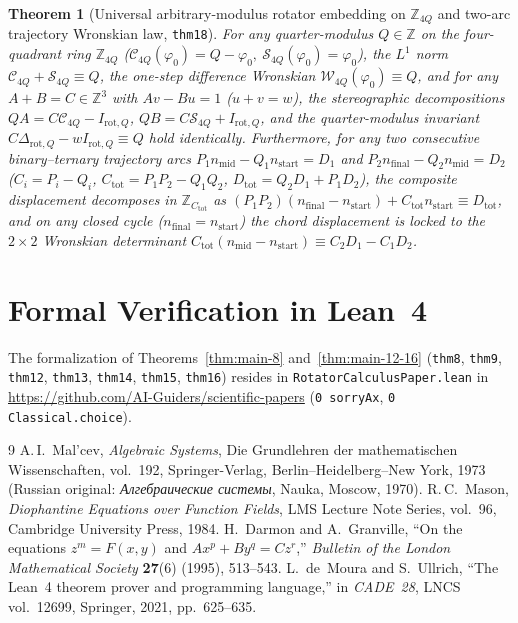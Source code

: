\documentclass[11pt,a4paper]{article}
\theoremstyle{plain}
\newtheorem{theorem}{Theorem}[section]
\theoremstyle{definition}
\begin{document}
\begin{theorem}[Universal arbitrary-modulus rotator embedding on $\mathbb{Z}_{4Q}$ and two-arc trajectory Wronskian law, \texttt{thm18}]
\label{thm:arbitrary-modulus-thm18}
For any quarter-modulus $Q\in\mathbb{Z}$ on the four-quadrant ring $\mathbb{Z}_{4Q}$ ($\mathcal{C}_{4Q}(\varphi_0)=Q-\varphi_0,\ \mathcal{S}_{4Q}(\varphi_0)=\varphi_0$), the $L^1$ norm $\mathcal{C}_{4Q}+\mathcal{S}_{4Q}\equiv Q$, the one-step difference Wronskian $\mathcal{W}_{4Q}(\varphi_0)\equiv Q$, and for any $A+B=C\in\mathbb{Z}^3$ with $Av-Bu=1$ ($u+v=w$), the stereographic decompositions $Q A = C\mathcal{C}_{4Q} - I_{\mathrm{rot},Q}$, $Q B = C\mathcal{S}_{4Q} + I_{\mathrm{rot},Q}$, and the quarter-modulus invariant $C\Delta_{\mathrm{rot},Q} - w I_{\mathrm{rot},Q} \equiv Q$ hold identically. Furthermore, for any two consecutive binary--ternary trajectory arcs $P_1 n_{\mathrm{mid}} - Q_1 n_{\mathrm{start}} = D_1$ and $P_2 n_{\mathrm{final}} - Q_2 n_{\mathrm{mid}} = D_2$ ($C_i = P_i - Q_i$, $C_{\mathrm{tot}} = P_1 P_2 - Q_1 Q_2$, $D_{\mathrm{tot}} = Q_2 D_1 + P_1 D_2$), the composite displacement decomposes in $\mathbb{Z}_{C_{\mathrm{tot}}}$ as $(P_1 P_2)(n_{\mathrm{final}} - n_{\mathrm{start}}) + C_{\mathrm{tot}} n_{\mathrm{start}} \equiv D_{\mathrm{tot}}$, and on any closed cycle ($n_{\mathrm{final}} = n_{\mathrm{start}}$) the chord displacement is locked to the $2\times 2$ Wronskian determinant $C_{\mathrm{tot}}(n_{\mathrm{mid}} - n_{\mathrm{start}}) \equiv C_2 D_1 - C_1 D_2$.
\end{theorem}

\section{Formal Verification in Lean~4}
\label{sec:lean4}

The formalization of Theorems~\ref{thm:main-8} and~\ref{thm:main-12-16} (\texttt{thm8}, \texttt{thm9}, \texttt{thm12}, \texttt{thm13}, \texttt{thm14}, \texttt{thm15}, \texttt{thm16}) resides in \texttt{RotatorCalculusPaper.lean} in \url{https://github.com/AI-Guiders/scientific-papers} (\texttt{0 sorryAx}, \texttt{0 Classical.choice}).

\begin{thebibliography}{9}
A.\,I.~Mal'cev, \emph{Algebraic Systems}, Die Grundlehren der mathematischen Wissenschaften, vol.~192, Springer-Verlag, Berlin--Heidelberg--New York, 1973 (Russian original: \emph{Алгебраические системы}, Nauka, Moscow, 1970).
R.\,C.~Mason, \emph{Diophantine Equations over Function Fields}, LMS Lecture Note Series, vol.~96, Cambridge University Press, 1984.
H.~Darmon and A.~Granville, ``On the equations $z^m = F(x,y)$ and $Ax^p + By^q = Cz^r$,'' \emph{Bulletin of the London Mathematical Society} \textbf{27}(6) (1995), 513--543.
L.~de~Moura and S.~Ullrich, ``The Lean~4 theorem prover and programming language,'' in \emph{CADE~28}, LNCS vol.~12699, Springer, 2021, pp.~625--635.
\end{thebibliography}
\end{document}
